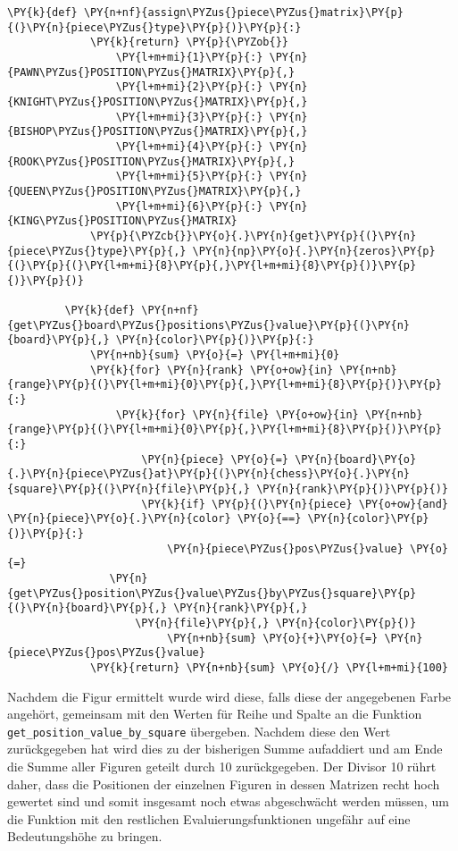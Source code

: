 \begin{Verbatim}[commandchars=\\\{\}]
         \PY{k}{def} \PY{n+nf}{assign\PYZus{}piece\PYZus{}matrix}\PY{p}{(}\PY{n}{piece\PYZus{}type}\PY{p}{)}\PY{p}{:}
             \PY{k}{return} \PY{p}{\PYZob{}}
                 \PY{l+m+mi}{1}\PY{p}{:} \PY{n}{PAWN\PYZus{}POSITION\PYZus{}MATRIX}\PY{p}{,}
                 \PY{l+m+mi}{2}\PY{p}{:} \PY{n}{KNIGHT\PYZus{}POSITION\PYZus{}MATRIX}\PY{p}{,}
                 \PY{l+m+mi}{3}\PY{p}{:} \PY{n}{BISHOP\PYZus{}POSITION\PYZus{}MATRIX}\PY{p}{,}
                 \PY{l+m+mi}{4}\PY{p}{:} \PY{n}{ROOK\PYZus{}POSITION\PYZus{}MATRIX}\PY{p}{,}
                 \PY{l+m+mi}{5}\PY{p}{:} \PY{n}{QUEEN\PYZus{}POSITION\PYZus{}MATRIX}\PY{p}{,}
                 \PY{l+m+mi}{6}\PY{p}{:} \PY{n}{KING\PYZus{}POSITION\PYZus{}MATRIX}
             \PY{p}{\PYZcb{}}\PY{o}{.}\PY{n}{get}\PY{p}{(}\PY{n}{piece\PYZus{}type}\PY{p}{,} \PY{n}{np}\PY{o}{.}\PY{n}{zeros}\PY{p}{(}\PY{p}{(}\PY{l+m+mi}{8}\PY{p}{,}\PY{l+m+mi}{8}\PY{p}{)}\PY{p}{)}\PY{p}{)}
         
         \PY{k}{def} \PY{n+nf}{get\PYZus{}board\PYZus{}positions\PYZus{}value}\PY{p}{(}\PY{n}{board}\PY{p}{,} \PY{n}{color}\PY{p}{)}\PY{p}{:}
             \PY{n+nb}{sum} \PY{o}{=} \PY{l+m+mi}{0}
             \PY{k}{for} \PY{n}{rank} \PY{o+ow}{in} \PY{n+nb}{range}\PY{p}{(}\PY{l+m+mi}{0}\PY{p}{,}\PY{l+m+mi}{8}\PY{p}{)}\PY{p}{:}
                 \PY{k}{for} \PY{n}{file} \PY{o+ow}{in} \PY{n+nb}{range}\PY{p}{(}\PY{l+m+mi}{0}\PY{p}{,}\PY{l+m+mi}{8}\PY{p}{)}\PY{p}{:}
                     \PY{n}{piece} \PY{o}{=} \PY{n}{board}\PY{o}{.}\PY{n}{piece\PYZus{}at}\PY{p}{(}\PY{n}{chess}\PY{o}{.}\PY{n}{square}\PY{p}{(}\PY{n}{file}\PY{p}{,} \PY{n}{rank}\PY{p}{)}\PY{p}{)}
                     \PY{k}{if} \PY{p}{(}\PY{n}{piece} \PY{o+ow}{and} \PY{n}{piece}\PY{o}{.}\PY{n}{color} \PY{o}{==} \PY{n}{color}\PY{p}{)}\PY{p}{:}
                         \PY{n}{piece\PYZus{}pos\PYZus{}value} \PY{o}{=} 
				\PY{n}{get\PYZus{}position\PYZus{}value\PYZus{}by\PYZus{}square}\PY{p}{(}\PY{n}{board}\PY{p}{,} \PY{n}{rank}\PY{p}{,} 
					\PY{n}{file}\PY{p}{,} \PY{n}{color}\PY{p}{)}
                         \PY{n+nb}{sum} \PY{o}{+}\PY{o}{=} \PY{n}{piece\PYZus{}pos\PYZus{}value}
             \PY{k}{return} \PY{n+nb}{sum} \PY{o}{/} \PY{l+m+mi}{100}
\end{Verbatim}

    Nachdem die Figur ermittelt wurde wird diese, falls diese der
angegebenen Farbe angehört, gemeinsam mit den Werten für Reihe und
Spalte an die Funktion \texttt{get\_position\_value\_by\_square}
übergeben. Nachdem diese den Wert zurückgegeben hat wird dies zu der
bisherigen Summe aufaddiert und am Ende die Summe aller Figuren geteilt
durch 10 zurückgegeben. Der Divisor 10 rührt daher, dass die Positionen
der einzelnen Figuren in dessen Matrizen recht hoch gewertet sind und
somit insgesamt noch etwas abgeschwächt werden müssen, um die Funktion
mit den restlichen Evaluierungsfunktionen ungefähr auf eine
Bedeutungshöhe zu bringen.

